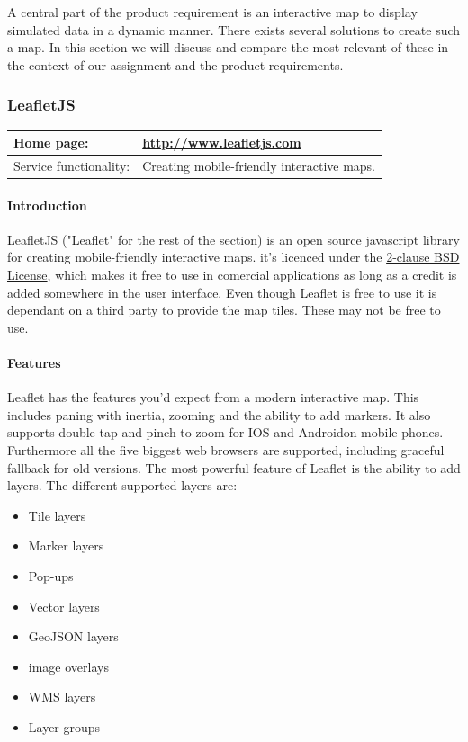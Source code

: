 \documentclass[11pt,a4paper,titlepage,oneside]{report}
\begin{document}
  A central part of the product requirement is an interactive map to display simulated data in a dynamic manner. There exists several solutions to create such a map. In this section we will discuss and compare the most relevant of these in the context of our assignment and the product requirements.

  \subsubsection{LeafletJS}
  \begin{tabular}{|p{4cm}|p{8cm}|}
    \hline
    Home page: & \url{http://www.leafletjs.com} \\
    \hline
    Service functionality: & Creating mobile-friendly interactive maps. \\
    \hline
  \end{tabular}
  
  \paragraph{Introduction} \indent
  LeafletJS ("Leaflet" for the rest of the section) is an open source javascript library for creating mobile-friendly interactive maps. it's licenced under the \href{'https://github.com/Leaflet/Leaflet/blob/master/LICENSE'}{2-clause BSD License}, which makes it free to use in comercial applications as long as a credit is added somewhere in the user interface.
  Even though Leaflet is free to use it is dependant on a third party to provide the map tiles. These may not be free to use.

  \paragraph{Features}
  Leaflet has the features you'd expect from a modern interactive map. This includes paning with inertia, zooming and the ability to add markers. It also supports double-tap and pinch to zoom for IOS and Androidon mobile phones. Furthermore all the five biggest web browsers are supported, including graceful fallback for old versions.
  The most powerful feature of Leaflet is the ability to add layers. 
  \newline The different supported layers are:

  \begin{itemize}
    \item Tile layers
    \item Marker layers
    \item Pop-ups
    \item Vector layers
    \item GeoJSON layers
    \item image overlays
    \item WMS layers
    \item Layer groups
  \end{itemize}
\end{document}
